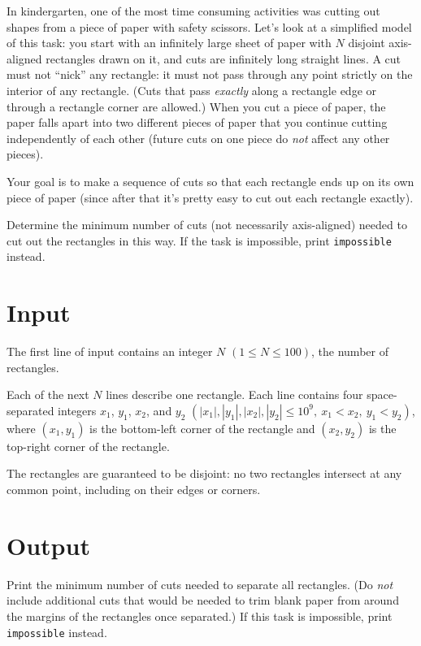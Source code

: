 
\newcommand{\fmaxn}{100}
\newcommand{\fmaxc}{10^{9}}

In kindergarten, one of the most time consuming activities was cutting out shapes from a piece of paper with safety scissors.
Let's look at a simplified model of this task: you start with an infinitely large sheet of paper with $N$ disjoint
axis-aligned rectangles drawn on it, and cuts are infinitely long straight lines.
A cut must not ``nick'' any rectangle: it must not pass through any point strictly on the interior of any rectangle. (Cuts that pass \emph{exactly} along a rectangle edge or through a rectangle corner are allowed.)
When you cut a piece of paper, the paper falls apart into two different pieces of paper that you continue cutting independently of each other (future cuts on one piece do \emph{not} affect any other pieces).

Your goal is to make a sequence of cuts so that each rectangle ends up on its own piece of paper (since after that it's pretty easy to cut out each rectangle exactly).

Determine the minimum number of cuts (not necessarily axis-aligned) needed to cut out the rectangles in this way. If the task is impossible, print \texttt{impossible} instead.

\section*{Input}
The first line of input contains an integer $N$ $(1 \leq N \leq \fmaxn)$, the number of rectangles.

Each of the next $N$ lines describe one rectangle.
Each line contains four space-separated integers $x_1$, $y_1$, $x_2$, and $y_2$
$(|x_1|, |y_1|, |x_2|, |y_2| \leq \fmaxc,\ x_1 < x_2,\ y_1 < y_2)$, where $(x_1, y_1)$ is the
bottom-left corner of the rectangle and $(x_2, y_2)$ is the top-right corner of the rectangle.

The rectangles are guaranteed to be disjoint: no two rectangles intersect at any common point, including on their edges or corners.

\section*{Output}
Print the minimum number of cuts needed to separate all rectangles. (Do \emph{not} include additional cuts that would be needed to trim blank paper from around the margins of the rectangles once separated.) If this task is impossible, print \texttt{impossible} instead.

